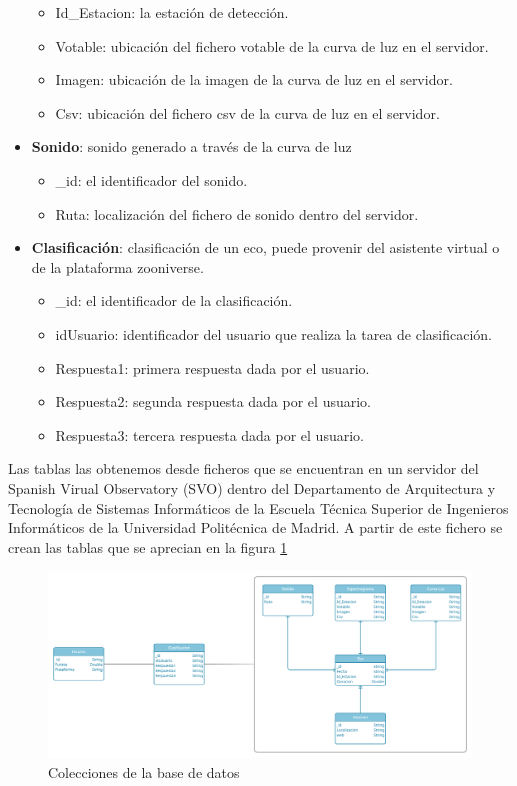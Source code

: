 \begin{itemize}
\begin{itemize}
            \item Id\_Estacion: la estación de detección.
            \item Votable: ubicación del fichero votable de la curva de luz en el servidor.
            \item Imagen: ubicación de la imagen de la curva de luz en el servidor.
            \item Csv: ubicación del fichero csv de la curva de luz en el servidor.
        \end{itemize}
    \item \textbf{Sonido}: sonido generado a través de la curva de luz
        \begin{itemize}
            \item \_id: el identificador del sonido.
            \item Ruta: localización del fichero de sonido dentro del servidor.
        \end{itemize}
    \item \textbf{Clasificación}: clasificación de un eco, puede provenir del asistente virtual o de la plataforma zooniverse.
        \begin{itemize}
            \item \_id: el identificador de la clasificación.
            \item idUsuario: identificador del usuario que realiza la tarea de clasificación.
            \item Respuesta1: primera respuesta dada por el usuario.
            \item Respuesta2: segunda respuesta dada por el usuario.
            \item Respuesta3: tercera respuesta dada por el usuario.
        \end{itemize}
\end{itemize}


Las tablas las obtenemos desde ficheros que se encuentran en un servidor del Spanish Virual Observatory (SVO) dentro del Departamento de Arquitectura y Tecnología de Sistemas Informáticos de la Escuela Técnica Superior de Ingenieros Informáticos de la Universidad Politécnica de Madrid. A partir de este fichero se crean las tablas que se aprecian en la figura \ref{fig:tablas_base_datos}

\begin{figure}[h]
    \centering
    \includegraphics[width=\textwidth]{include/figuras/Tablas.png}
    \caption{Colecciones de la base de datos}
    \label{fig:tablas_base_datos}
\end{figure}

